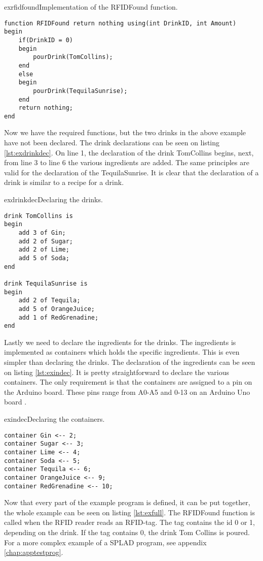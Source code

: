 \begin{code}{exrfidfound}{Implementation of the RFIDFound function.}
\begin{lstlisting}
function RFIDFound return nothing using(int DrinkID, int Amount)
begin
	if(DrinkID = 0)
	begin
		pourDrink(TomCollins);
	end
	else
	begin
		pourDrink(TequilaSunrise);
	end
	return nothing;
end
\end{lstlisting}
\end{code}

Now we have the required functions, but the two drinks in the above example have not been declared. The drink declarations can be seen on listing \ref{lst:exdrinkdec}. On line 1, the declaration of the drink TomCollins begins, next, from line 3 to line 6 the various ingredients are added. The same principles are valid for the declaration of the TequilaSunrise. It is clear that the declaration of a drink is similar to a recipe for a drink. 

\begin{code}{exdrinkdec}{Declaring the drinks.}
\begin{lstlisting}
drink TomCollins is
begin
	add 3 of Gin;
	add 2 of Sugar;
	add 2 of Lime;
	add 5 of Soda;
end

drink TequilaSunrise is 
begin
	add 2 of Tequila;
	add 5 of OrangeJuice;
	add 1 of RedGrenadine;
end
\end{lstlisting}
\end{code}

Lastly we need to declare the ingredients for the drinks. The ingredients is implemented as containers which holds the specific ingredients. This is even simpler than declaring the drinks. The declaration of the ingredients can be seen on listing \ref{lst:exindec}. It is pretty straightforward to declare the various containers. The only requirement is that the containers are assigned to a pin on the Arduino board. These pins range from A0-A5 and 0-13 on an Arduino Uno board \citep{ArduinoUno}.

\begin{code}{exindec}{Declaring the containers.}
\begin{lstlisting}
container Gin <-- 2;
container Sugar <-- 3;
container Lime <-- 4;
container Soda <-- 5;
container Tequila <-- 6;
container OrangeJuice <-- 9;
container RedGrenadine <-- 10;
\end{lstlisting}
\end{code}

Now that every part of the example program is defined, it can be put together, the whole example can be seen on listing \ref{lst:exfull}. The RFIDFound function is called when the RFID reader reads an RFID-tag. The tag contains the id 0 or 1, depending on the drink. If the tag contains 0, the drink Tom Collins is poured. For a more complex example of a SPLAD program, see appendix \ref{chap:apptestprog}.

